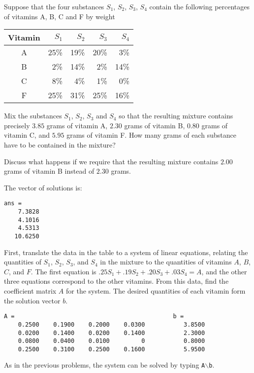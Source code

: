 \documentclass{ximera}
\begin{document}
\begin{computerExercise} \label{c2.1.7}
Suppose that the four substances $S_1$, $S_2$, $S_3$, $S_4$
contain the following percentages of vitamins A, B, C and F by
weight
\begin{center}
\begin{tabular}{|c||r|r|r|r|}
\hline
Vitamin   & $S_1$ & $S_2$ & $S_3$ & $S_4$\\
\hline
 A & 25\% &    19\% &    20\% &    3\% \\
 B &  2\% &    14\% &     2\% &   14\% \\
 C &  8\% &     4\% &     1\% &     0\% \\
 F & 25\% &    31\% &    25\% &    16\% \\
\hline
\end{tabular}
\end{center}
Mix the substances $S_1$, $S_2$, $S_3$ and $S_4$ so that the
resulting mixture contains precisely $3.85$ grams of vitamin A,
$2.30$ grams of vitamin B, $0.80$ grams of vitamin C, and $5.95$
grams of vitamin F.  How many grams of each substance have to be
contained in the mixture?

Discuss what happens if we require that the resulting mixture contains
$2.00$ grams of vitamin B instead of $2.30$ grams.

\begin{solution}
\ans The vector of solutions is:
\begin{verbatim}
ans =
    7.3828
    4.1016
    4.5313
   10.6250
\end{verbatim}
\soln First, translate the data in the table to a system of linear
equations, relating the quantities of $S_1$, $S_2$, $S_3$, and $S_4$
in the mixture to the quantities of vitamins $A$, $B$, $C$, and $F$. 
The first equation is $.25S_1 + .19S_2 + .20S_3 + .03S_4 = A$, and
the other three equations correspond to the other vitamins.  From
this data, find the coefficient matrix $A$ for the system.  The desired
quantities of each vitamin form the solution vector $b$.
\begin{verbatim}
A =                                             b =
    0.2500    0.1900    0.2000    0.0300           3.8500
    0.0200    0.1400    0.0200    0.1400           2.3000
    0.0800    0.0400    0.0100         0           0.8000
    0.2500    0.3100    0.2500    0.1600           5.9500
\end{verbatim}
As in the previous problems, the system can be solved by
typing {\tt A}$\backslash${\tt b}.


\end{solution}
\end{computerExercise}
\end{document}
